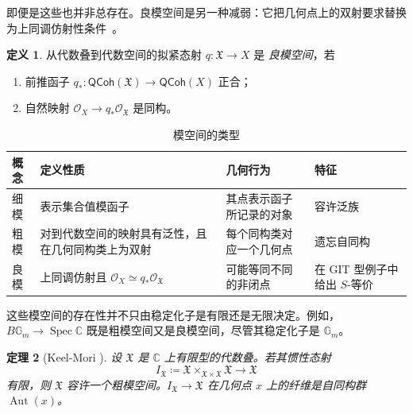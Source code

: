 \documentclass{amsart}
\newtheorem{thm}{定理}[section]
\theoremstyle{definition}
\newtheorem{defn}[thm]{定义}
\theoremstyle{remark}
\theoremstyle{plain}
\theoremstyle{definition}
\theoremstyle{remark}
\newcommand{\G}{\mathbb{G}}
\newcommand{\C}{\mathbb{C}}
\newcommand{\mc}[1]{\mathcal{#1}}
\newcommand{\mf}[1]{\mathfrak{#1}}
\newcommand{\on}[1]{\operatorname{#1}}
\newcommand{\ms}[1]{\mathsf{#1}}
\newcommand{\1}{\mathbf{1}}
\newcommand{\2}{\mathbf{2}}
\newcommand{\3}{\mathbf{3}}
\begin{document}
即便是这些也并非总存在。良模空间是另一种减弱：它把几何点上的双射要求替换为上同调仿射性条件~\cite{Alper2013}。

\begin{defn}
    从代数叠到代数空间的拟紧态射 \(q\colon\mf{X}\to X\) 是 \textit{良模空间}，若
    \begin{enumerate}
        \item 前推函子 \(q_*\colon\ms{QCoh}(\mf{X})\to\ms{QCoh}(X)\) 正合；
        \item 自然映射 \(\mc{O}_X\to q_*\mc{O}_{\mf{X}}\) 是同构。
    \end{enumerate}
\end{defn}

\begin{table}[htpb]
    \centering
    \caption{模空间的类型}
    \label{tab:moduli-types-corrected}
    \renewcommand{\arraystretch}{1.3}
    \begin{tabular}{
        p{}
        p{}
        p{}
        p{}
    }
        \toprule
        \textbf{概念}
        & \textbf{定义性质}
        & \textbf{几何行为}
        & \textbf{特征}
        \\
        \midrule
        细模
        & 表示集合值模函子
        & 其点表示函子所记录的对象
        & 容许泛族
        \\
        粗模
        & 对到代数空间的映射具有泛性，且在几何同构类上为双射
        & 每个同构类对应一个几何点
        & 遗忘自同构
        \\
        良模
        & 上同调仿射且
          \(\mc{O}_X \simeq q_*\mc{O}_{\mf{X}}\)
        & 可能等同不同的非闭点
        & 在 GIT 型例子中给出 \(S\)-等价
        \\
        \bottomrule
    \end{tabular}
\end{table}

这些模空间的存在性并不只由稳定化子是有限还是无限决定。例如，\(B\G_m\to\on{Spec}\C\) 既是粗模空间又是良模空间，尽管其稳定化子是 \(\G_m\)。

\begin{thm}[Keel-Mori {\cite{KeelMori1997}}]
    设 \(\mf{X}\) 是 \(\C\) 上有限型的代数叠。若其惯性态射
    \[
        I_{\mf{X}}
        \coloneqq
        \mf{X}\times_{\mf{X}\times\mf{X}}\mf{X}
        \longrightarrow \mf{X}
    \]
    有限，则 \(\mf{X}\) 容许一个粗模空间。\(I_{\mf{X}}\to\mf{X}\) 在几何点 \(x\) 上的纤维是自同构群 \(\on{Aut}(x)\)。
\end{thm}
\end{document}
